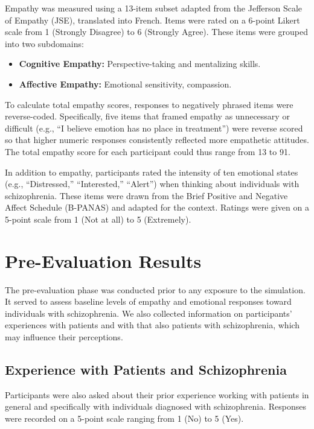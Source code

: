 Empathy was measured using a 13-item subset adapted from the Jefferson Scale of Empathy (JSE), translated into French. Items were rated on a 6-point Likert scale from 1 (Strongly Disagree) to 6 (Strongly Agree). These items were grouped into two subdomains:

\begin{itemize}
  \item \textbf{Cognitive Empathy:} Perspective-taking and mentalizing skills.
  \item \textbf{Affective Empathy:} Emotional sensitivity, compassion.
\end{itemize}

To calculate total empathy scores, responses to negatively phrased items were reverse-coded. Specifically, five items that framed empathy as unnecessary or difficult (e.g., “I believe emotion has no place in treatment”) were reverse scored so that higher numeric responses consistently reflected more empathetic attitudes. The total empathy score for each participant could thus range from 13 to 91.

In addition to empathy, participants rated the intensity of ten emotional states (e.g., “Distressed,” “Interested,” “Alert”) when thinking about individuals with schizophrenia. These items were drawn from the Brief Positive and Negative Affect Schedule (B-PANAS) and adapted for the context. Ratings were given on a 5-point scale from 1 (Not at all) to 5 (Extremely).

\section{Pre-Evaluation Results}
The pre-evaluation phase was conducted prior to any exposure to the simulation. It served to assess baseline levels of empathy and emotional responses toward individuals with schizophrenia. We also collected information on participants' experiences with patients and with that also patients with schizophrenia, which may influence their perceptions.

\subsection{Experience with Patients and Schizophrenia}

Participants were also asked about their prior experience working with patients in general and specifically with individuals diagnosed with schizophrenia. Responses were recorded on a 5-point scale ranging from 1 (No) to 5 (Yes).


